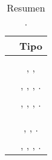 

\begin{table}[H]
    \centering
\begin{tabular}{ |l|c| }

\hline
	&
	Tipo \frameworkPC%


\\ \hline
	\derbyNAMEref &
	\isomorphicJSFwASref%
	
\\ \hline
	\socketStreamNAMEref &
	\socketStreamNAMEref, \emberjsNAME, \nodejsNAME%
	
\\ \hline
	\meanstackNAMEref &
	\mongodbNAME, \expressjsNAME, \angularjsNAME, \nodejsNAME.%
	
\\ \hline
	\meenstackNAMEref &
	\mongodbNAME, \emberjsNAME, \expressjsNAME, \nodejsNAME.%
 
\\ \hline
	\meteorNAMEref &
	\isomorphicJSFwASref%
	
\\ \hline
	\mojitoNAMEref &
	\isomorphicJSFwASref%
	
\\ \hline
	\saneNAMEref &
	\sailsNAME, \emberjsNAME, \nodejsNAME. %
	
	
\\ \hline
	\sleekjsNAMEref &
	\handlebarsNAME, \expressjsNAME, \mongooseNAME, \nodejsNAME.%
	

\\ \hline
\end{tabular}
    \caption{Resumen \fullStackJSFwASref.}
    \label{tab:resume_full_stack_javaScript}
\end{table}
